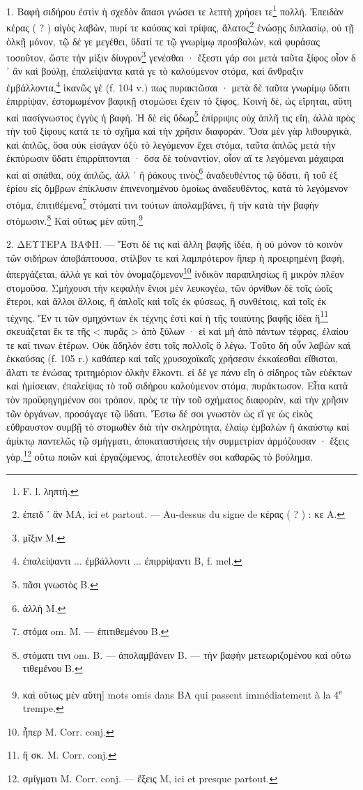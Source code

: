 \documentclass[a4paper, 11pt, oneside, polutonikogreek, french]{article}
\begin{document}
\bigskip

1. Βαφὴ σιδήρου ἐστὶν ἡ σχεδὸν ἅπασι γνώσει τε λεπτὴ χρήσει τε\footnote{F. l. ληπτὴ.} πολλή. Ἐπειδὰν κέρας ( ? ) αἰγὸς λαβὼν, πυρί τε καύσας καὶ τρίψας, ἅλατος\footnote{ἐπειδ ᾽ ἂν MA, ici et partout. --- Au-dessus du signe de κέρας ( ? ) : κε A.} ἑνώσῃς διπλασίῳ, οὐ τῇ ὁλκῇ μόνον, τῷ δέ γε μεγέθει, ὕδατί τε τῷ γνωρίμῳ προσβαλὼν, καὶ φυράσας τοσοῦτον, ὥστε τὴν μίξιν δίυγρον\footnote{μῖξιν M.} γενέσθαι · ἔξεστι γάρ σοι μετὰ ταῦτα ξίφος οἷον δ ᾽ ἂν καὶ βούλῃ, ἐπαλείψαντα κατά γε τὸ καλούμενον στόμα, καὶ ἄνθραξιν ἐμβάλλοντα,\footnote{ἐπαλείψαντι ... ἐμβάλλοντι ... ἐπιρρίψαντι B, f. mel.} ἱκανῶς γέ (f. 104 v.) πως πυρακτῶσαι · μετὰ δὲ ταῦτα γνωρίμῳ ὕδατι ἐπιρρίψαν, ἐστομωμένον βαφικῇ στομώσει ἔχειν τὸ ξίφος. Κοινὴ δὲ, ὡς εἴρηται, αὕτη καὶ πασίγνωστος ἐγγὺς ἡ βαφή. Ἡ δὲ εἰς ὕδωρ\footnote{πᾶσι γνωστὸς B.} ἐπίρριψις οὐχ ἁπλῆ τις εἴη, ἀλλὰ πρὸς τὴν τοῦ ξίφους κατά τε τὸ σχῆμα καὶ τὴν χρῆσιν διαφοράν. Ὅσα μὲν γὰρ λιθουργικὰ, καὶ ἁπλῶς, ὅσα οὐκ εἰσάγαν ὀξὺ τὸ λεγόμενον ἔχει στόμα, ταῦτα ἁπλῶς μετὰ τὴν ἐκπύρωσιν ὕδατι ἐπιρρίπτονται · ὅσα δὲ τοὐναντίον, οἷον αἵ τε λεγόμεναι μάχαιραι καὶ αἱ σπάθαι, οὐχ ἁπλῶς, ἀλλ ᾽ ἢ ῥάκους τινὸς\footnote{ἀλλὴ M.} ἀναδευθέντος τῷ ὕδατι, ἢ τοῦ ἐξ ἐρίου εἰς ὄμβρων ἐπίκλυσιν ἐπινενοημένου ὁμοίως ἀναδευθέντος, κατὰ τὸ λεγόμενον στόμα, ἐπιτιθέμενα\footnote{στόμα om. M. --- ἐπιτιθεμένου B.} στόματί τινι τούτων ἀπολαμβάνει, ἢ τὴν κατὰ τὴν βαφὴν στόμωσιν.\footnote{στόματι τινι om. B. --- ἀπολαμβάνειν B. --- τὴν βαφὴν μετεωριζομένου καὶ οὕτω τιθεμένου B.} Καὶ οὕτως μὲν αὕτη.\footnote{καὶ οὕτως μὲν αὕτη] mots omis dans BA qui passent immédiatement à la 4\textsuperscript{e} trempe.}

2. ΔΕΥΤΕΡΑ ΒΑΦΗ. --- Ἔστι δέ τις καὶ ἄλλη βαφῆς ἰδέα, ἡ οὐ μόνον τὸ κοινὸν τῶν σιδήρων ἀποβάπτουσα, στίλβον τε καὶ λαμπρότερον ἤπερ ἡ προειρημένη βαφὴ, ἀπεργάζεται, ἀλλά γε καὶ τὸν ὀνομαζόμενον\footnote{ἧπερ M. Corr. conj.} ἰνδικὸν παραπλησίως ἢ μικρὸν πλέον στομοῦσα. Σμήχουσι τὴν κεφαλὴν ἔνιοι μὲν λευκογέω, τῶν ὀρνίθων δὲ τοῖς ὠοῖς ἕτεροι, καὶ ἄλλοι ἄλλοις, ἢ ἁπλοῖς καὶ τοῖς ἐκ φύσεως, ἢ συνθέτοις, καὶ τοῖς ἐκ τέχνης. Ἕν τι τῶν σμηχόντων ἐκ τέχνης ἐστὶ καὶ ἡ τῆς τοιαύτης βαφῆς ἰδέα ἣ\footnote{ἢ σκ. M. Corr. conj.} σκευάζεται ἔκ τε τῆς < πυρᾶς > ἀπὸ ξύλων · εἰ καὶ μὴ ἀπὸ πάντων τέφρας, ἐλαίου τε καί τινων ἑτέρων. Οὐκ ἄδηλόν ἐστι τοῖς πολλοῖς ὃ λέγω. Τοῦτο δὴ οὖν λαβὼν καὶ ἐκκαύσας (f. 105 r.) καθάπερ καὶ ταῖς χρυσοχοϊκαῖς χρήσεσιν ἐκκαίεσθαι εἴθισται, ἅλατι τε ἑνώσας τριτημόριον ὁλκὴν ἕλκοντι. εἰ δέ γε πάνυ εἴη ὁ σίδηρος τῶν εὐέκτων καὶ ἡμίσειαν, ἐπαλείψας τὸ τοῦ σιδήρου καλούμενον στόμα, πυράκτωσον. Εἶτα κατὰ τὸν προϋφηγημένον σοι τρόπον, πρὸς τε τὴν τοῦ σχήματος διαφορὰν, καὶ τὴν χρῆσιν τῶν ὀργάνων, προσάγαγε τῷ ὕδατι. Ἔστω δέ σοι γνωστὸν ὡς εἴ γε ὡς εἰκὸς εὔθραυστον συμβῇ τὸ στομωθὲν διὰ τὴν σκληρότητα, ἐλαίῳ ἐμβαλὼν ἢ ἀκαύστῳ καὶ ἀμίκτῳ παντελῶς τῷ σμήγματι, ἀποκαταστήσεις τὴν συμμετρίαν ἁρμόζουσαν · ἕξεις γὰρ,\footnote{σμίγματι M. Corr. conj. --- ἔξεις M, ici et presque partout.} οὕτω ποιῶν καὶ ἐργαζόμενος, ἀποτελεσθέν σοι καθαρῶς τὸ βούλημα.
\end{document}
